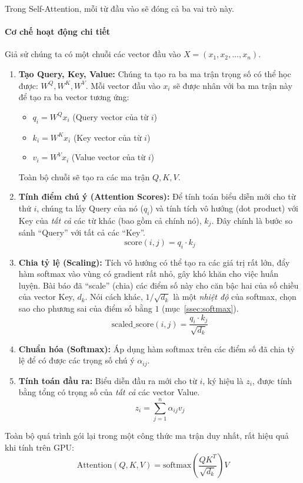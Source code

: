 Trong Self-Attention, mỗi từ đầu vào sẽ đóng cả ba vai trò này.
\paragraph{Cơ chế hoạt động chi tiết}
Giả sử chúng ta có một chuỗi các vector đầu vào $X = (x_1, x_2, \dots, x_n)$.
\begin{enumerate}
    \item \textbf{Tạo Query, Key, Value:} Chúng ta tạo ra ba ma trận trọng số có thể học được: $W^Q, W^K, W^V$. Mỗi vector đầu vào $x_i$ sẽ được nhân với ba ma trận này để tạo ra ba vector tương ứng:
        \begin{itemize}
            \item $q_i = W^Q x_i$ (Query vector của từ $i$)
            \item $k_i = W^K x_i$ (Key vector của từ $i$)
            \item $v_i = W^V x_i$ (Value vector của từ $i$)
        \end{itemize}
        Toàn bộ chuỗi sẽ tạo ra các ma trận $Q, K, V$.
    \item \textbf{Tính điểm chú ý (Attention Scores):} Để tính toán biểu diễn mới cho từ thứ $i$, chúng ta lấy Query của nó ($q_i$) và tính tích vô hướng (dot product) với Key của \textit{tất cả} các từ khác (bao gồm cả chính nó), $k_j$. Đây chính là bước so sánh “Query” với tất cả các “Key”.
        $$ \text{score}(i, j) = q_i \cdot k_j $$
    \item \textbf{Chia tỷ lệ (Scaling):} Tích vô hướng có thể tạo ra các giá trị rất lớn, đẩy hàm softmax vào vùng có gradient rất nhỏ, gây khó khăn cho việc huấn luyện. Bài báo đã “scale” (chia) các điểm số này cho căn bậc hai của số chiều của vector Key, $d_k$. Nói cách khác, $1/\sqrt{d_k}$ là một \emph{nhiệt độ} của softmax, chọn sao cho phương sai của điểm số bằng $1$ (mục~\ref{ssec:softmax}).
        $$ \text{scaled\_score}(i, j) = \frac{q_i \cdot k_j}{\sqrt{d_k}} $$
    \item \textbf{Chuẩn hóa (Softmax):} Áp dụng hàm softmax trên các điểm số đã chia tỷ lệ để có được các trọng số chú ý $\alpha_{ij}$.
    \item \textbf{Tính toán đầu ra:} Biểu diễn đầu ra mới cho từ $i$, ký hiệu là $z_i$, được tính bằng tổng có trọng số của \textit{tất cả} các vector Value.
        $$ z_i = \sum_{j=1}^{n} \alpha_{ij} v_j $$
\end{enumerate}

Toàn bộ quá trình gói lại trong một công thức ma trận duy nhất, rất hiệu quả khi tính trên GPU:
\begin{equation}
    \text{Attention}(Q, K, V) = \text{softmax}\left(\frac{QK^T}{\sqrt{d_k}}\right)V
    \label{eq:scaled_dot_product_attention}
\end{equation}

